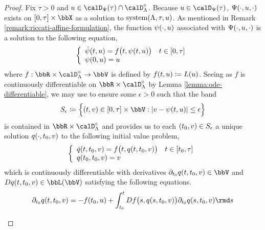 \begin{proof}
  \label{proof:proposition:momentSpace-facts}
  Fix $\tau > 0$ and $\momentVar \in \momentSpace(\tau) \cap \odeSpace^\circ$.
  Because $\momentVar \in \momentSpace(\tau)$, $\Psi(\cdot,u,\cdot)$ exists on $[0,\tau]\times\stateSpace$ as a solution to $\operatorname{system}(\Lambda,\tau,u)$.
  As mentioned in Remark \ref{remark:riccati-affine-formulation}, the function $\psi(\cdot,u)$ associated with $\Psi(\cdot,u,\cdot)$ is a solution to the following equation,
  \begin{equation}
    \label{eq:system'}
    \left\{\begin{array}{ll}
      \dot{\psi}(t,u) = f\big(t, \psi(t,u)\big) & t \in [0,\tau] \\
      \psi(0,u) = u
    \end{array}\right.
  \end{equation}
  where $f: \bbR \times \odeSpace^\circ \rightarrow \vecSpace$ is defined by $f(t, u) \coloneqq L(u)$.
  Seeing as $f$ is continuously differentiable on $\bbR \times \odeSpace^\circ$ by Lemma \ref{lemma:ode-differentiable}, we may use \cite[III.13 Theorem X]{walter1998} to ensure some $\epsilon > 0$ such that the band
  \begin{equation*}
    S_\epsilon \defeq \Big\{ (t, \vecVar) \in [0,\tau] \times \vecSpace : |\vecVar-\affPart(t,\momentVar)| \leq \epsilon \Big\}
  \end{equation*}
  is contained in $\bbR \times \odeSpace^\circ$ and provides us to each $(t_0, v) \in S_\epsilon$ a unique solution $q(\cdot,t_0,v)$ to the following initial value problem,
  \begin{equation*}
    \left\{\begin{array}{ll}
      \dot q(t,t_0,v) = f\big(t, q(t,t_0,v)\big) & t \in [t_0,\tau] \\
      q(t_0,t_0,v) = v
    \end{array}\right.
  \end{equation*}
  which is continuously differentiable with derivatives $\partial_{t_0} q(t,t_0,\vecVar) \in \vecSpace$ and $Dq(t,t_0,\vecVar) \in \bbL(\vecSpace)$ satisfying the following equations.
  \begin{align*}
    \partial_{t_0} q(t, t_0, \vecVar) 
    &= -f(t_0,\momentVar) + \int_{t_0}^t Df\big(s, q(s,t_0,\vecVar) \big) \partial_{t_0} q(s,t_0, \vecVar) \rmd s \\[0.5em]

\end{align*}
\end{proof}
